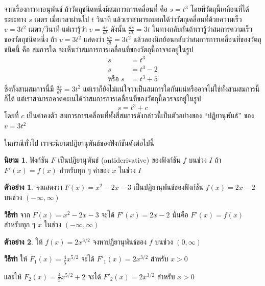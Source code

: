 \documentclass[
]{book}
\theoremstyle{definition}
\newtheorem{definition}{นิยาม}[chapter]
\theoremstyle{definition}
\newtheorem{example}{ตัวอย่าง}[chapter]
\theoremstyle{definition}
\theoremstyle{definition}
\theoremstyle{remark}
\begin{document}
จากเรื่องการหาอนุพันธ์ ถ้าวัตถุชนิดหนึ่งมีสมการการเคลื่อนที่ คือ \(s = t^{3}\)
โดยที่วัตถุนี้เคลื่อนที่ได้ระยะทาง \(s\) เมตร เมื่อเวลาผ่านไป \(t\) วินาที
แล้วเราสามารถบอกได้ว่าวัตถุเคลื่อนที่ด้วยความเร็ว \(v =
3t^2\) เมตร/วินาที แต่เรารู้ว่า \(\displaystyle v = \frac{ds}{dt}\) ดังนั้น
\(\displaystyle  \frac{ds}{dt} = 3t\)
ในทางกลับกันถ้าเรารู้ว่าสมการความเร็วของวัตถุชนิดหนึ่ง ถ้า \(v = 3t^{2}\) แสดงว่า
\(\displaystyle \frac{ds}{dt} = 3t^2\)
แล้วลองนึกย้อนกลับว่าสมการการเคลื่อนที่ของวัตถุชนิดนี้ คือ สมการใด
จะเห็นว่าสมการการเคลื่อนที่ของวัตถุนี้อาจจะอยู่ในรูป 
\[\begin{aligned}
    s &= t^3 \\ 
    s &= t^3 -2 \\
    \text{หรือ  } s &= t^3 + 5
\end{aligned}\]
ซึ่งทั้งสามสมการนี้มี \(\displaystyle  \frac{ds}{dt}= 3t^2\)
แต่เราก็ยังไม่แน่ใจว่าเป็นสมการใดกันแน่หรืออาจไม่ใช่ทั้งสามสมการนี้ก็ได้
แต่เราสามารถคาดคะเนได้ว่าสมการการเคลื่อนที่ของวัตถุนี้ควรจะอยู่ในรูป \[s = t^{3} + c\]
โดยที่ \(c\) เป็นค่าคงตัว สมการการเคลื่อนที่ทั้งสี่สมการดังกล่าวนี้เป็นตัวอย่างของ ``ปฏิยานุพันธ์''
ของ \(v = 3t^{2}\)

ในกรณีทั่วไป เราจะนิยามปฏิยานุพันธ์ของฟังก์ชันดังต่อไปนี้

\begin{definition}
ฟังก์ชัน \(F\) เป็นปฏิยานุพันธ์ (antiderivative) ของฟังก์ชัน \(f\) บนช่วง \(I\) ถ้า
\(F'(x) = f(x)\) สำหรับทุก ๆ ค่าของ \(x\) ในช่วง \(I\)
\end{definition}

\begin{example}
จงแสดงว่า \(F(x) = x^{2}-2x- 3\) เป็นปฏิยานุพันธ์ของฟังก์ชัน \(f(x)=2x-2\) บนช่วง
\(\left( {-\infty ,\infty } \right)\)
\end{example}

\textbf{วิธีทำ} จาก \(F(x) = x^{2} - 2x - 3\) จะได้ \(F'(x)
= 2x - 2\) นั่นคือ \(F'(x) = f(x)\) สำหรับทุก ๆ \(x\) ในช่วง \(\left( {-\infty
,\infty } \right)\)

\begin{example}
ให้ \(f(x) = 2x^{3/2}\) จงหาปฏิยานุพันธ์ของ \(f\) บนช่วง
\(\left( {0 ,\infty } \right)\)
\end{example}

\textbf{วิธีทำ} ให้ \(\displaystyle F_{1}(x) = \frac{4}{5} x^{5/2}\) จะได้
\(F'_1(x) = 2x^{3/2}\) สำหรับ \(x > 0\)

และให้ \(\displaystyle F_{2}(x) = \frac{4}{5} x^{5/2} + 2\) จะได้
\(F'_2(x) = 2x^{3/2}\) สำหรับ \(x > 0\)
\end{document}
